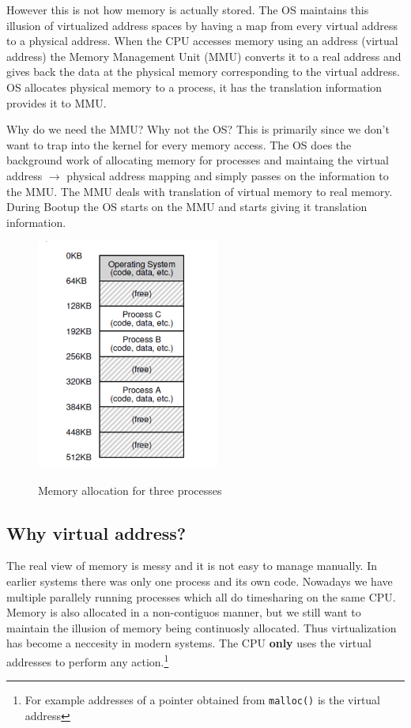 \documentclass[12pt]{article}
\begin{document}
However this is not how memory is actually stored. The OS maintains this illusion of virtualized address spaces by having a map from every virtual address to a physical address. When the CPU accesses memory 
using an address (virtual address) the Memory Management Unit (MMU) converts it to a real address and gives back the data at the physical memory corresponding to the virtual address. OS allocates physical memory to a process, it has the translation information
provides it to MMU.

Why do we need the MMU? Why not the OS? This is primarily since we don't want to trap into the kernel for every memory access. The OS does the background work
of allocating memory for processes and maintaing the virtual address $\rightarrow$ physical address mapping and simply passes on the information to the MMU.
The MMU deals with translation of virtual memory to real memory. During Bootup the OS starts on the MMU and starts giving it translation information.

\begin{figure}
    \begin{center}
        \includegraphics[width = 6cm]{memory_allocation.png}
        \label{figure:memory_alloc}
        \caption{Memory allocation for three processes}
    \end{center}
\end{figure}


\subsection*{Why virtual address?}
The real view of memory is messy and it is not easy to manage manually. In earlier systems there was only one process and its own code. Nowadays we have multiple
parallely running processes which all do time\-sharing on the same CPU. Memory is also allocated in a non-contiguos manner, but we still want to maintain the illusion of memory being continuosly allocated. 
Thus virtualization has become a neccesity in modern systems. The CPU \textbf{only} uses the virtual addresses to perform any action.\footnote{For example addresses of a pointer obtained from \texttt{malloc()} is the virtual address}
\end{document}
